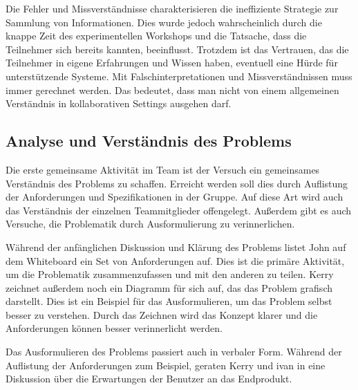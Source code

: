 Die Fehler und Missverständnisse charakterisieren die ineffiziente Strategie zur Sammlung von Informationen. Dies wurde jedoch wahrscheinlich durch die knappe Zeit des experimentellen Workshops und die Tatsache, dass die Teilnehmer sich bereits kannten, beeinflusst. Trotzdem ist das Vertrauen, das die Teilnehmer in eigene Erfahrungen und Wissen haben, eventuell eine Hürde für unterstützende Systeme. Mit Falschinterpretationen und Missverständnissen muss immer gerechnet werden. Das bedeutet, dass man nicht von einem allgemeinen Verständnis in kollaborativen Settings ausgehen darf. 

\subsection{Analyse und Verständnis des Problems}\label{sec:collabProblem}

Die erste gemeinsame Aktivität im Team ist der Versuch ein gemeinsames Verständnis des Problems zu schaffen. Erreicht werden soll dies durch Auflistung der Anforderungen und Spezifikationen in der Gruppe. Auf diese Art wird auch das Verständnis der einzelnen Teammitglieder offengelegt. Außerdem gibt es auch Versuche, die Problematik durch Ausformulierung zu verinnerlichen.

\medskip Während der anfänglichen Diskussion und Klärung des Problems listet John auf dem Whiteboard ein Set von Anforderungen auf. Dies ist die primäre Aktivität, um die Problematik zusammenzufassen und mit den anderen zu teilen. Kerry zeichnet außerdem noch ein Diagramm für sich auf, das das Problem grafisch darstellt. Dies ist ein Beispiel für das Ausformulieren, um das Problem selbst besser zu verstehen. Durch das Zeichnen wird das Konzept klarer und die Anforderungen können besser verinnerlicht werden.

\medskip Das Ausformulieren des Problems passiert auch in verbaler Form. Während der Auflistung der Anforderungen zum Beispiel, geraten Kerry und ivan in eine Diskussion über die Erwartungen der Benutzer an das Endprodukt.

